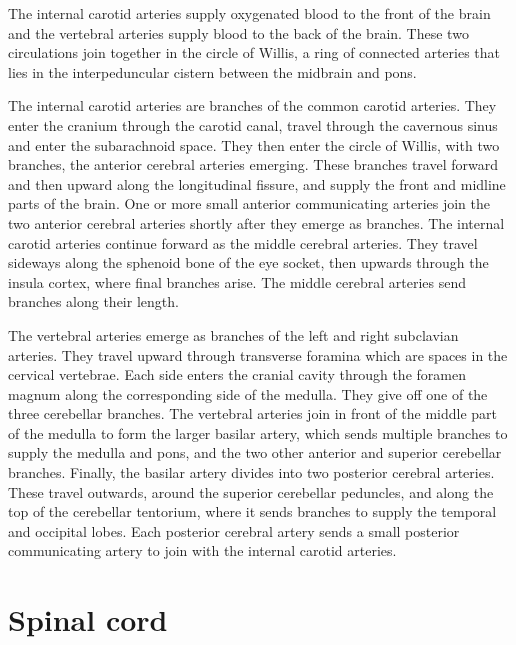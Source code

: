 The internal carotid arteries supply oxygenated blood to the front of the brain and the vertebral arteries supply blood to the back of the brain. These two circulations join together in the circle of Willis, a ring of connected arteries that lies in the interpeduncular cistern between the midbrain and pons.

The internal carotid arteries are branches of the common carotid arteries. They enter the cranium through the carotid canal, travel through the cavernous sinus and enter the subarachnoid space. They then enter the circle of Willis, with two branches, the anterior cerebral arteries emerging. These branches travel forward and then upward along the longitudinal fissure, and supply the front and midline parts of the brain. One or more small anterior communicating arteries join the two anterior cerebral arteries shortly after they emerge as branches. The internal carotid arteries continue forward as the middle cerebral arteries. They travel sideways along the sphenoid bone of the eye socket, then upwards through the insula cortex, where final branches arise. The middle cerebral arteries send branches along their length.

The vertebral arteries emerge as branches of the left and right subclavian arteries. They travel upward through transverse foramina which are spaces in the cervical vertebrae. Each side enters the cranial cavity through the foramen magnum along the corresponding side of the medulla. They give off one of the three cerebellar branches. The vertebral arteries join in front of the middle part of the medulla to form the larger basilar artery, which sends multiple branches to supply the medulla and pons, and the two other anterior and superior cerebellar branches. Finally, the basilar artery divides into two posterior cerebral arteries. These travel outwards, around the superior cerebellar peduncles, and along the top of the cerebellar tentorium, where it sends branches to supply the temporal and occipital lobes. Each posterior cerebral artery sends a small posterior communicating artery to join with the internal carotid arteries.

\hypertarget{spinal-cord}{%
\section{Spinal cord}\label{spinal-cord}}

